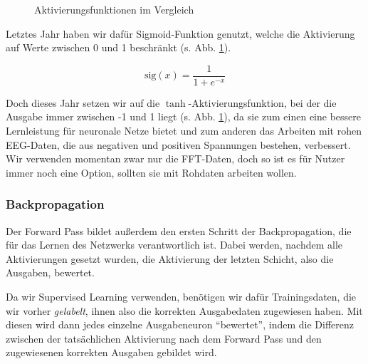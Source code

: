\documentclass[10pt]{article}
\newcommand{\eng}[1]{\textit{#1}}
\newcommand{\sig}{\textrm{sig}}
\begin{document}
\begin{figure}[h!]
    \centering
    \caption{Aktivierungsfunktionen im Vergleich}
    \label{fig:act_funcs}
\end{figure}

Letztes Jahr haben wir dafür Sigmoid-Funktion genutzt, welche die Aktivierung auf Werte zwischen 0 und 1 beschränkt (s. Abb. \ref{fig:act_funcs}).

\[
    \sig(x) = \frac{1}{1+e^{-x}}
\]

Doch dieses Jahr setzen wir auf die $\tanh$-Aktivierungsfunktion, bei der die Ausgabe immer zwischen -1 und 1 liegt (s. Abb. \ref{fig:act_funcs}), da sie zum einen eine bessere Lernleistung für neuronale Netze bietet \cite{blog:activationFunctions, blog:tanhVsSigmoid} und zum anderen das Arbeiten mit rohen EEG-Daten, die aus negativen und positiven Spannungen bestehen, verbessert.
Wir verwenden momentan zwar nur die FFT-Daten, doch so ist es für Nutzer immer noch eine Option, sollten sie mit Rohdaten arbeiten wollen.

\subsubsection{Backpropagation}

Der Forward Pass bildet außerdem den ersten Schritt der Backpropagation, die für das Lernen des Netzwerks verantwortlich ist.
Dabei werden, nachdem alle Aktivierungen gesetzt wurden, die Aktivierung der letzten Schicht, also die Ausgaben, bewertet.

Da wir Supervised Learning verwenden, benötigen wir dafür Trainingsdaten, die wir vorher \eng{gelabelt}, ihnen also die korrekten Ausgabedaten zugewiesen haben.
Mit diesen wird dann jedes einzelne Ausgabeneuron \enquote{bewertet}, indem die Differenz zwischen der tatsächlichen Aktivierung nach dem Forward Pass und den zugewiesenen korrekten Ausgaben gebildet wird.

        
\end{document}
